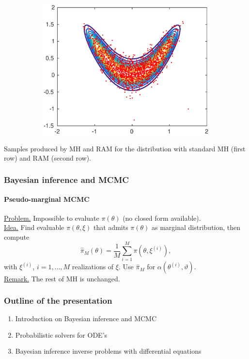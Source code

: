 \documentclass{beamer}
\begin{document}
\begin{frame}
\begin{figure}[t]
\begin{subfigure}{0.32\linewidth}
			\includegraphics[width=1\linewidth]{../plots/MHvsRAM/RAM_big}
		\end{subfigure}
	\end{figure}
	Samples produced by MH and RAM for the distribution with standard MH (first row) and RAM (second row).
\end{frame}

\begin{frame}
	\frametitle{Bayesian inference and MCMC}
	\framesubtitle{Pseudo-marginal MCMC \cite{ADH10, DPD15, MLR16}}
	
	\underline{Problem.} Impossible to evaluate $\pi(\theta)$ (no closed form available). \\[0.5cm]
	\underline{Idea.} Find evaluable $\pi(\theta, \xi)$ that admits $\pi(\theta)$ as marginal distribution, then compute
	\begin{equation*}
		\hat \pi_M(\theta) = \frac{1}{M} \sum_{i = 1}^{M} \pi(\theta, \xi^{(i)}),
	\end{equation*}
	with $\xi^{(i)}$, $i = 1, \ldots, M$ realizations of $\xi$. Use $\hat \pi_M$ for $\alpha(\theta^{(i)}, \vartheta)$. \\[0.5cm]
	\underline{Remark.} The rest of MH is unchanged.	
\end{frame}


\begin{frame}
	\frametitle{Outline of the presentation}
	\begin{enumerate}
		\item \color{mygray} Introduction on Bayesian inference and MCMC
		\item \color{black} Probabilistic solvers for ODE's
		\item Bayesian inference inverse problems with differential equations
	\end{enumerate}
\end{frame}
\end{document}
